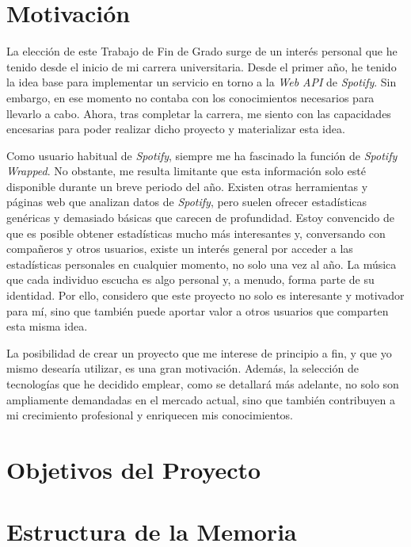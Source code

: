 \section{Motivación}

La elección de este Trabajo de Fin de Grado surge de un interés personal que he tenido desde el inicio de mi carrera universitaria. Desde el primer año, he tenido la idea base para implementar un servicio en torno a la \textit{Web API} de \textit{Spotify}. Sin embargo, en ese momento no contaba con los conocimientos necesarios para llevarlo a cabo. Ahora, tras completar la carrera, me siento con las capacidades encesarias para poder realizar dicho proyecto y materializar esta idea.

Como usuario habitual de \textit{Spotify}, siempre me ha fascinado la función de \textit{Spotify Wrapped}. No obstante, me resulta limitante que esta información solo esté disponible durante un breve periodo del año. Existen otras herramientas y páginas web que analizan datos de \textit{Spotify}, pero suelen ofrecer estadísticas genéricas y demasiado básicas que carecen de profundidad. Estoy convencido de que es posible obtener estadísticas mucho más interesantes y, conversando con compañeros y otros usuarios, existe un interés general por acceder a las estadísticas personales en cualquier momento, no solo una vez al año. La música que cada individuo escucha es algo personal y, a menudo, forma parte de su identidad. Por ello, considero que este proyecto no solo es interesante y motivador para mí, sino que también puede aportar valor a otros usuarios que comparten esta misma idea.

La posibilidad de crear un proyecto que me interese de principio a fin, y que yo mismo desearía utilizar, es una gran motivación. Además, la selección de tecnologías que he decidido emplear, como se detallará más adelante, no solo son ampliamente demandadas en el mercado actual, sino que también contribuyen a mi crecimiento profesional y enriquecen mis conocimientos.

\section{Objetivos del Proyecto}

\section{Estructura de la Memoria}
\cite{Shahbaba2011}
